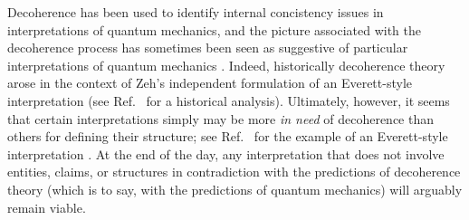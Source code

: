 \documentclass[aps,pra,reprint,amsmath,amssymb,showpacs,nofootinbib,floatfix,onecolumn,12pt]{revtex4-1}
\begin{document}
Decoherence has been used to identify internal concistency issues in interpretations of quantum mechanics, and the picture associated with the decoherence process has sometimes been seen as suggestive of particular interpretations of quantum mechanics \cite{Schlosshauer:2003:tv, Bacciagaluppi:2003:yz}. Indeed, historically decoherence theory arose in the context of Zeh's \cite{Zeh:1970:yt} independent formulation of an Everett-style interpretation (see Ref.~\cite{Camilleri:2009:aq} for a historical analysis). Ultimately, however, it seems that certain interpretations simply may be more \emph{in need} of decoherence than others for defining their structure; see Ref.~\cite{Wallace:2010:im} for the example of an Everett-style interpretation \cite{Everett:1957:rw}. At the end of the day, any interpretation that does not involve entities, claims, or structures in contradiction with the predictions of decoherence theory (which is to say, with the predictions of quantum mechanics) will arguably remain viable. 



% 
% 
\end{document}
